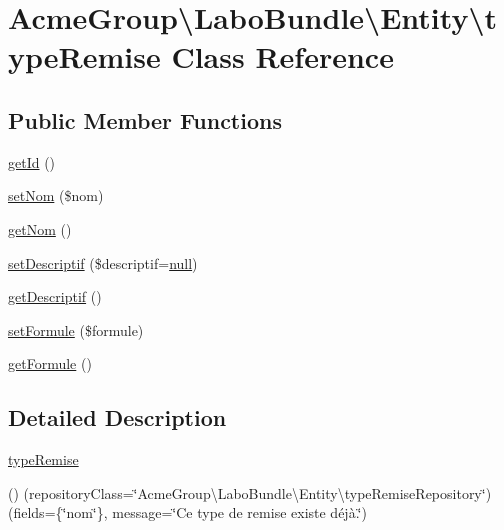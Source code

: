 \hypertarget{class_acme_group_1_1_labo_bundle_1_1_entity_1_1type_remise}{\section{Acme\+Group\textbackslash{}Labo\+Bundle\textbackslash{}Entity\textbackslash{}type\+Remise Class Reference}
\label{class_acme_group_1_1_labo_bundle_1_1_entity_1_1type_remise}
}
\subsection*{Public Member Functions}
\begin{DoxyCompactItemize}
\item 
\hyperlink{class_acme_group_1_1_labo_bundle_1_1_entity_1_1type_remise_ac94ce677ce44765990175e3fbc620c2a}{get\+Id} ()
\item 
\hyperlink{class_acme_group_1_1_labo_bundle_1_1_entity_1_1type_remise_ac382e03f31b081a0e5d95a4e5a926958}{set\+Nom} (\$nom)
\item 
\hyperlink{class_acme_group_1_1_labo_bundle_1_1_entity_1_1type_remise_a3394889e7eda8f0e15fca13c711ce086}{get\+Nom} ()
\item 
\hyperlink{class_acme_group_1_1_labo_bundle_1_1_entity_1_1type_remise_abc3e61b7fc58ef3e48f5d6012255384d}{set\+Descriptif} (\$descriptif=\hyperlink{validate_8js_afb8e110345c45e74478894341ab6b28e}{null})
\item 
\hyperlink{class_acme_group_1_1_labo_bundle_1_1_entity_1_1type_remise_afd1208b64c4227ccfbda0452cf214a41}{get\+Descriptif} ()
\item 
\hyperlink{class_acme_group_1_1_labo_bundle_1_1_entity_1_1type_remise_a397dc25db00c44b3f49c6aadd40a3fe8}{set\+Formule} (\$formule)
\item 
\hyperlink{class_acme_group_1_1_labo_bundle_1_1_entity_1_1type_remise_a1c5a317046a407c48a999e4ba4bc2b8e}{get\+Formule} ()
\end{DoxyCompactItemize}


\subsection{Detailed Description}
\hyperlink{class_acme_group_1_1_labo_bundle_1_1_entity_1_1type_remise}{type\+Remise}

() (repository\+Class=\char`\"{}\+Acme\+Group\textbackslash{}\+Labo\+Bundle\textbackslash{}\+Entity\textbackslash{}type\+Remise\+Repository\char`\"{}) (fields=\{\char`\"{}nom\char`\"{}\}, message=\char`\"{}\+Ce type de remise existe déjà.\char`\"{}) 

